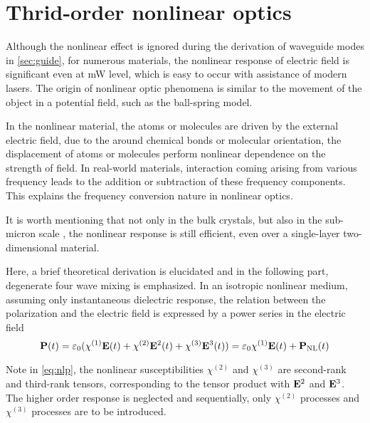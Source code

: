 \section{Thrid-order nonlinear optics}

Although the nonlinear effect is ignored during the derivation of waveguide modes in \autoref{sec:guide}, 
for numerous materials, the nonlinear response of electric field is significant even at mW level, which is easy to occur with assistance of modern lasers. The origin of nonlinear optic phenomena is similar to the movement of the object in a potential field, such as the ball-spring model. 

In the nonlinear material, the atoms or molecules are driven by the external electric field, due to the around chemical bonds or molecular orientation, the displacement of atoms or molecules perform nonlinear dependence on the strength of field. In real-world materials, interaction coming arising from various frequency leads to the addition or subtraction of these frequency components. This explains the frequency conversion nature in nonlinear optics.

It is worth mentioning that not only in the bulk crystals, but also in the sub-micron scale \cite{Leuthold2010}, the nonlinear response is still efficient, even over a single-layer two-dimensional material.

Here, a brief theoretical derivation is elucidated and in the following part, degenerate four wave mixing is emphasized. In an isotropic nonlinear medium, assuming only instantaneous dielectric response, the relation between the polarization and the electric field is expressed by a power series in the electric field
\begin{equation}\label{eq:nlp}
    \vb{P}(t) = \varepsilon_0 \large (\chi^{(1)}\vb{E}(t) + \chi^{(2)}\vb{E}^2(t) + \chi^{(3)}\vb{E}^3(t))
    = \varepsilon_0 \chi^{(1)}\vb{E}(t) + \vb{P}_\mathrm{NL}(t)
\end{equation}

Note in \autoref{eq:nlp}, the nonlinear susceptibilities $\chi^{(2)}$ and $\chi^{(3)}$ are second-rank and third-rank tensors, corresponding to the tensor product with $\vb{E}^2$ and $\vb{E}^3$. The higher order response is neglected and sequentially, only $\chi^{(2)}$ processes and $\chi^{(3)}$ processes are to be introduced.

